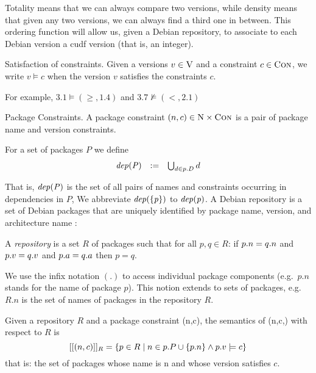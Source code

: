 Totality means that we can always compare two versions, while density
means that given any two versions, we can always find a third one in
between. This ordering function will allow us, given a Debian
repository, to associate to each Debian version a cudf version (that
is, an integer).

\begin{definition}{Satisfaction of constraints.}
  Given a versions $v \in \textsc{V}$ and a constraint $c \in \textsc{Con}$, we
  write $v \models c$ when the version $v$ satisfies the constraints $c$.
\end{definition}

For example, $3.1 \models (\geq,1.4)$ and $3.7 \not\models (<,2.1)$

\begin{definition}{Package Constraints.} 
  A package constraint $(n,c) \in \textsc{N}\times\textsc{Con} $ is a pair of
  package name and version constraints. 
\end{definition}

\begin{definition}
  For a set of packages $P$ we define
  \[
    \begin{array}{lcl}
      \mathit{dep(P)} & := & \bigcup_{d \in p.D} d \\
    \end{array}
  \]
\end{definition}

That is, $\mathit{dep(P)}$ is the set of all pairs of names and constraints
occurring in dependencies in $P$, We abbreviate $\mathit{dep(\{p\})}$ to
$\mathit{dep(p)}$.  A Debian repository is a set of Debian packages that are
uniquely identified by package name, version, and architecture name :

\begin{definition}
  \label{def:repository}
  A \emph{repository} is a set $R$ of packages such that for all $p, q
  \in R$: if $p.n=q.n$ and $p.v=q.v$ and 
  $p.a=q.a$ then $p=q$.
\end{definition}

We use the infix notation $(.)$ to access individual package
components (e.g.~$p.n$ stands for the name of package $p$). This
notion extends to sets of packages, e.g.~$R.n$ is the set of names of
packages in the repository $R$.

\begin{definition}
    Given a repository $R$ and a package constraint (n,c), the
    semantics of (n,c,) with respect to $R$ is
    \[
      [[(n,c)]]_R = 
      \{ p \in R \mid n \in p.P \cup \{ p.n \} \wedge p.v \models c \}
    \]
    that is: the set of packages whose name is n and whose version
    satisfies $c$.
\end{definition}

